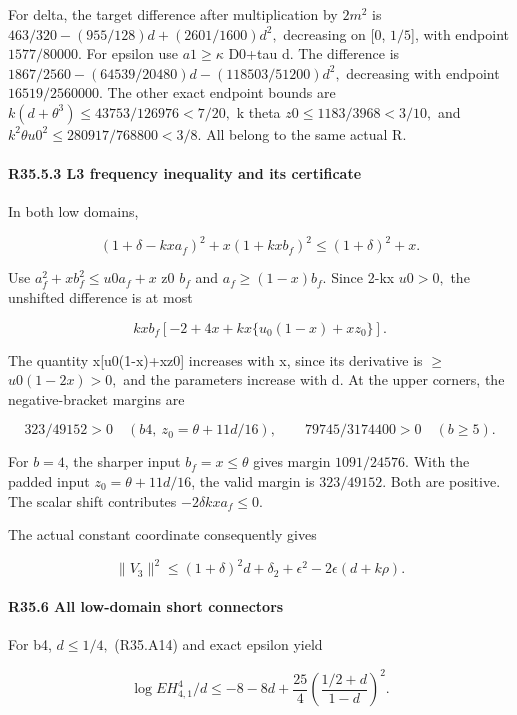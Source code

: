 For delta, the target difference after multiplication by \(2m^2\) is
\(463/320-(955/128)d+(2601/1600)d^2,\allowbreak \) decreasing on [0, \(1/5\)], with endpoint \(1577/80000.\)
For epsilon use \(a1\ge \kappa\) D0+tau d. The difference is
\(1867/2560-(64539/20480)d-(118503/51200)d^2,\allowbreak \) decreasing with endpoint \(16519/2560000.\)
The other exact endpoint bounds are
\(k(d+\theta^3)\le 43753/126976<7/20,\allowbreak \)
k theta \(z0\le 1183/3968<3/10,\allowbreak \) and
\(k^2\theta u0^2\le 280917/768800<3/8.\)
All belong to the same actual R.

\paragraph{R35.5.3 L3 frequency inequality and its certificate}

In both low domains,

\[
(1+\delta-kxa_f)^2+x(1+kxb_f)^2\le(1+\delta)^2+x. \tag{R35.A27}
\]

Use \(a_f^2+x b_f^2\le u0 a_f+x\) z0 \(b_f\) and \(a_f\ge (1-x)b_f.\) Since 2-kx \(u0>0,\allowbreak \) the unshifted difference is at most

\[
kx b_f[-2+4x+kx\{u_0(1-x)+xz_0\}].
\]

The quantity x[u0(1-x)+xz0] increases with x, since its derivative is \ensuremath{\ge}\(u0(1-2x)>0,\allowbreak \) and the parameters increase with d. At the upper corners, the negative-bracket margins are

\[
323/49152>0\quad(b4,\ z_0=\theta+11d/16),\qquad
79745/3174400>0\quad(b\ge5).
\]

For $b=4$, the sharper input $b_f=x\le\theta$ gives margin $1091/24576$. With the padded input $z_0=\theta+11d/16$, the valid margin is $323/49152$. Both are positive. The scalar shift contributes $-2\delta kx a_f\le0$.

The actual constant coordinate consequently gives

\[
\|V_3\|^2\le(1+\delta)^2d+\delta_2+\epsilon^2-2\epsilon(d+k\rho). \tag{R35.A28}
\]



\paragraph{R35.6 All low-domain short connectors}\label{part:R35.6}

For b4, \(d\le 1/4,\allowbreak \) (R35.A14) and exact epsilon yield

\[
\log EH_{4,1}^4/d\le-8-8d+\frac{25}{4}\left(\frac{1/2+d}{1-d}\right)^2.\tag{R35.A29}
\]

